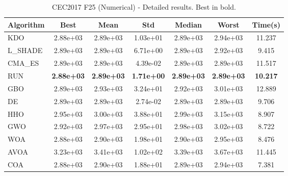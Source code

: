 \begin{table}[H]
\centering\small
\caption{CEC2017 F25 (Numerical) - Detailed results. Best in bold.}
\label{tab:cec2017_F25}
\begin{tabular}{lcccccc}
\toprule
\textbf{Algorithm} & \textbf{Best} & \textbf{Mean} & \textbf{Std} & \textbf{Median} & \textbf{Worst} & \textbf{Time(s)} \\
\midrule
KDO & 2.88e+03 & 2.89e+03 & 1.03e+01 & 2.89e+03 & 2.94e+03 & 11.237 \\
L_SHADE & 2.89e+03 & 2.89e+03 & 6.71e+00 & 2.89e+03 & 2.92e+03 & 9.415 \\
CMA_ES & 2.89e+03 & 2.89e+03 & 4.39e-02 & 2.89e+03 & 2.89e+03 & 11.517 \\
RUN & \textbf{2.88e+03} & \textbf{2.89e+03} & \textbf{1.71e+00} & \textbf{2.89e+03} & \textbf{2.89e+03} & \textbf{10.217} \\
GBO & 2.89e+03 & 2.93e+03 & 3.24e+01 & 2.92e+03 & 3.01e+03 & 12.889 \\
DE & 2.89e+03 & 2.89e+03 & 2.74e-02 & 2.89e+03 & 2.89e+03 & 9.706 \\
HHO & 2.95e+03 & 3.00e+03 & 3.88e+01 & 2.99e+03 & 3.15e+03 & 8.907 \\
GWO & 2.92e+03 & 2.97e+03 & 2.95e+01 & 2.98e+03 & 3.02e+03 & 8.722 \\
WOA & 2.88e+03 & 2.90e+03 & 1.98e+01 & 2.90e+03 & 2.95e+03 & 8.476 \\
AVOA & 3.23e+03 & 3.41e+03 & 1.02e+02 & 3.39e+03 & 3.67e+03 & 11.445 \\
COA & 2.88e+03 & 2.90e+03 & 1.88e+01 & 2.89e+03 & 2.94e+03 & 7.381 \\
\bottomrule
\end{tabular}
\end{table}
